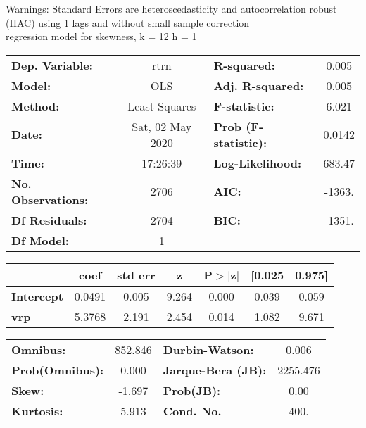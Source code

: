 Warnings: \newline
 [1] Standard Errors are heteroscedasticity and autocorrelation robust (HAC) using 1 lags and without small sample correction\\ 

regression model for skewness, k = 12 h = 1\begin{center}
\begin{tabular}{lclc}
\toprule
\textbf{Dep. Variable:}    &       rtrn       & \textbf{  R-squared:         } &     0.005   \\
\textbf{Model:}            &       OLS        & \textbf{  Adj. R-squared:    } &     0.005   \\
\textbf{Method:}           &  Least Squares   & \textbf{  F-statistic:       } &     6.021   \\
\textbf{Date:}             & Sat, 02 May 2020 & \textbf{  Prob (F-statistic):} &   0.0142    \\
\textbf{Time:}             &     17:26:39     & \textbf{  Log-Likelihood:    } &    683.47   \\
\textbf{No. Observations:} &        2706      & \textbf{  AIC:               } &    -1363.   \\
\textbf{Df Residuals:}     &        2704      & \textbf{  BIC:               } &    -1351.   \\
\textbf{Df Model:}         &           1      & \textbf{                     } &             \\
\bottomrule
\end{tabular}
\begin{tabular}{lcccccc}
                   & \textbf{coef} & \textbf{std err} & \textbf{z} & \textbf{P$> |$z$|$} & \textbf{[0.025} & \textbf{0.975]}  \\
\midrule
\textbf{Intercept} &       0.0491  &        0.005     &     9.264  &         0.000        &        0.039    &        0.059     \\
\textbf{vrp}       &       5.3768  &        2.191     &     2.454  &         0.014        &        1.082    &        9.671     \\
\bottomrule
\end{tabular}
\begin{tabular}{lclc}
\textbf{Omnibus:}       & 852.846 & \textbf{  Durbin-Watson:     } &    0.006  \\
\textbf{Prob(Omnibus):} &   0.000 & \textbf{  Jarque-Bera (JB):  } & 2255.476  \\
\textbf{Skew:}          &  -1.697 & \textbf{  Prob(JB):          } &     0.00  \\
\textbf{Kurtosis:}      &   5.913 & \textbf{  Cond. No.          } &     400.  \\
\bottomrule
\end{tabular}
\end{center}


